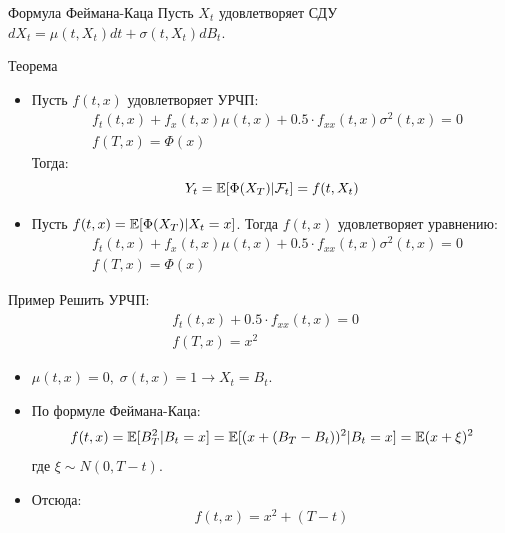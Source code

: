 \documentclass{beamer}
\begin{document}
\begin{frame}{Формула Феймана-Каца}
    Пусть $X_t$ удовлетворяет СДУ $dX_t = \mu(t, X_t) dt + \sigma(t, X_t) dB_t$. 
    \begin{block}{Теорема}
    \begin{itemize}
        \item Пусть $f(t, x)$ удовлетворяет УРЧП:
        \begin{align*}
            &f_t(t, x) + f_x(t, x) \mu(t, x) + 0.5 \cdot f_{xx}(t, x) \sigma^2(t, x) = 0 \\
            &f(T, x) = \Phi(x)
        \end{align*} Тогда:
        $$
            Y_t = \mathbb{E}[\Phi(X_T) | \mathcal{F}_t] = f(t, X_t)
        $$

        \item Пусть $f(t, x) = \mathbb{E}[\Phi(X_T) | X_t = x]$. Тогда $f(t, x)$ удовлетворяет уравнению:
        \begin{align*}
            &f_t(t, x) + f_x(t, x) \mu(t, x) + 0.5 \cdot f_{xx}(t, x) \sigma^2(t, x) = 0 \\
            &f(T, x) = \Phi(x)
        \end{align*}

    \end{itemize}

    \end{block}
\end{frame}

\begin{frame}{Пример}
    Решить УРЧП:
    \begin{align*}
        &f_t(t, x) + 0.5 \cdot f_{xx}(t, x)  = 0 \\
        &f(T, x) = x^2
    \end{align*}

    \pause
    \begin{itemize}
        \item $\mu(t, x) = 0, \; \sigma(t, x) = 1 \to X_t = B_t$. 

        \item По формуле Феймана-Каца:
        $$
            f(t, x) = \mathbb{E}[B_T^2 | B_t = x] = \mathbb{E}[ (x + (B_T-B_t))^2 | B_t = x ] = \mathbb{E}(x+\xi)^2
        $$где $\xi \sim N(0, T-t)$.

        \item Отсюда:
        $$
            f(t, x) = x^2 + (T-t)
        $$
    \end{itemize}
\end{frame}
\end{document}
